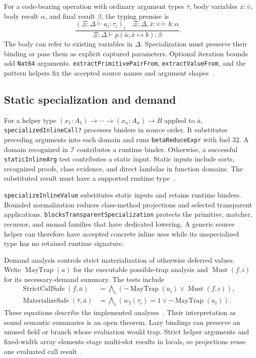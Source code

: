 \documentclass[11pt]{article}
\newcommand{\code}[1]{\texttt{#1}}
\newcommand{\I}{\mathcal{I}}
\begin{document}
For a code-bearing operation with ordinary argument types $\bar\tau$, body variables $\bar x:\bar\upsilon$, body result $\alpha$, and final result $\beta$, the typing premise is
\[
\frac{(\Xi;\Delta\vdash a_i:\tau_i)_i\quad
       \Xi;\Delta,\bar x:\bar\upsilon\vdash b:\alpha}
      {\Xi;\Delta\vdash p(\bar a;\bar x\mapsto b):\beta}.
\]
The body can refer to existing variables in $\Delta$.  Specialization must preserve their binding or pass them as explicit captured parameters.  Optional iteration bounds add \code{Nat64} arguments.  \code{extractPrimitivePairFrom}, \code{extractValueFrom}, and the pattern helpers fix the accepted source names and argument shapes~\cite{extract,patterns}.

\subsection{Static specialization and demand}

For a helper type $(x_1:A_1)\to\cdots\to(x_n:A_n)\to B$ applied to $\bar a$, \code{specializedInlineCall?} processes binders in source order.  It substitutes preceding arguments into each domain and runs \code{betaReduceExpr} with fuel 32.  A domain recognized in $\I$ contributes a runtime binder.  Otherwise, a successful \code{staticInlineArg} test contributes a static input.  Static inputs include sorts, recognized proofs, class evidence, and direct lambdas in function domains.  The substituted result must have a supported runtime type~\cite{types}.

\code{specializeInlineValue} substitutes static inputs and retains runtime binders.  Bounded normalization reduces class-method projections and selected transparent applications.  \code{blocksTransparentSpecialization} protects the primitive, matcher, recursor, and monad families that have dedicated lowering.  A generic source helper can therefore have accepted concrete inline uses while its unspecialized type has no retained runtime signature.

Demand analysis controls strict materialization of otherwise deferred values.  Write $\operatorname{MayTrap}(a)$ for the executable possible-trap analysis and $\operatorname{Must}(f,i)$ for its necessary-demand summary.  The tests include
\begin{align*}
\operatorname{StrictCallSafe}(f,\bar a)
  &=\bigwedge_i(\neg\operatorname{MayTrap}(a_i)\lor\operatorname{Must}(f,i)),\\
\operatorname{MaterializeSafe}(\bar\tau,\bar a)
  &=\bigwedge_i(w_I(\tau_i)=1\lor\neg\operatorname{MayTrap}(a_i)).
\end{align*}
These equations describe the implemented analyses~\cite{demand}.  Their interpretation as sound semantic summaries is an open theorem.  Lazy bindings can preserve an unused field or branch whose evaluation would trap.  Strict helper arguments and fixed-width array elements stage multi-slot results in locals, so projections reuse one evaluated call result~\cite{storage,extract}.
\end{document}
